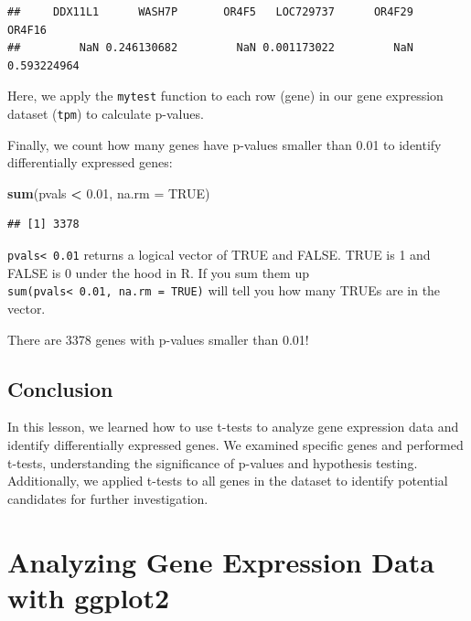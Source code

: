 \documentclass[
]{book}
\newenvironment{Shaded}{\begin{snugshade}}{\end{snugshade}}
\newcommand{\AttributeTok}[1]{\textcolor[rgb]{0.13,0.29,0.53}{#1}}
\newcommand{\ConstantTok}[1]{\textcolor[rgb]{0.56,0.35,0.01}{#1}}
\newcommand{\FloatTok}[1]{\textcolor[rgb]{0.00,0.00,0.81}{#1}}
\newcommand{\FunctionTok}[1]{\textcolor[rgb]{0.13,0.29,0.53}{\textbf{#1}}}
\newcommand{\NormalTok}[1]{#1}
\newcommand{\SpecialCharTok}[1]{\textcolor[rgb]{0.81,0.36,0.00}{\textbf{#1}}}
\begin{document}
\begin{verbatim}
##     DDX11L1      WASH7P       OR4F5   LOC729737      OR4F29      OR4F16 
##         NaN 0.246130682         NaN 0.001173022         NaN 0.593224964
\end{verbatim}

Here, we apply the \texttt{mytest} function to each row (gene) in our gene expression dataset (\texttt{tpm}) to calculate p-values.

Finally, we count how many genes have p-values smaller than 0.01 to identify differentially expressed genes:

\begin{Shaded}
\begin{Highlighting}[]
\FunctionTok{sum}\NormalTok{(pvals }\SpecialCharTok{\textless{}} \FloatTok{0.01}\NormalTok{, }\AttributeTok{na.rm =} \ConstantTok{TRUE}\NormalTok{)}
\end{Highlighting}
\end{Shaded}

\begin{verbatim}
## [1] 3378
\end{verbatim}

\texttt{pvals\textless{}\ 0.01} returns a logical vector of TRUE and FALSE. TRUE is 1 and FALSE is 0 under the hood in R. If you sum them up \texttt{sum(pvals\textless{}\ 0.01,\ na.rm\ =\ TRUE)} will tell you how many TRUEs are in the vector.

There are 3378 genes with p-values smaller than 0.01!

\hypertarget{conclusion-31}{%
\subsection{Conclusion}\label{conclusion-31}}

In this lesson, we learned how to use t-tests to analyze gene expression data and identify differentially expressed genes. We examined specific genes and performed t-tests, understanding the significance of p-values and hypothesis testing. Additionally, we applied t-tests to all genes in the dataset to identify potential candidates for further investigation.

\hypertarget{analyzing-gene-expression-data-with-ggplot2}{%
\section{Analyzing Gene Expression Data with ggplot2}\label{analyzing-gene-expression-data-with-ggplot2}}
\end{document}
